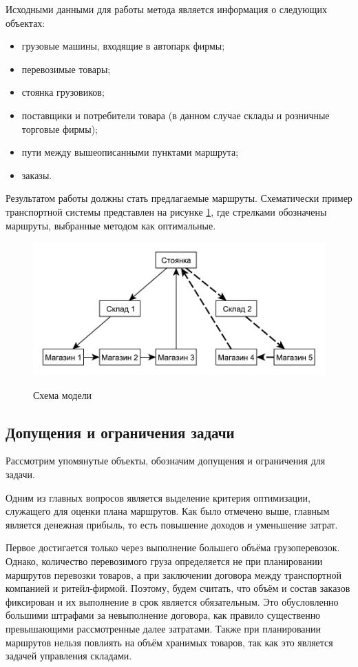 	Исходными данными для работы метода является информация о следующих объектах:
	\begin{itemize}
		\item грузовые машины, входящие в автопарк фирмы;
		\item перевозимые товары;
		\item стоянка грузовиков;
		\item поставщики и потребители товара (в данном случае склады и розничные торговые фирмы);
		\item пути между вышеописанными пунктами маршрута;
		\item заказы.
	\end{itemize}

	Результатом работы должны стать предлагаемые маршруты. Схематически пример транспортной системы представлен на рисунке \ref{pic:model}, где стрелками обозначены маршруты, выбранные методом как оптимальные.
	
	\begin{figure}[h!] 
		\begin{center}
			{\includegraphics[scale=0.9, angle=0]{img/model.pdf}}
			\caption{Схема модели}
			\label{pic:model}
		\end{center}
	\end{figure}
	
	\subsection{Допущения и ограничения задачи}
	Рассмотрим упомянутые объекты, обозначим допущения и ограничения для задачи.
	
	Одним из главных вопросов является выделение критерия оптимизации, служащего для оценки плана маршрутов. Как было отмечено выше, главным является денежная прибыль, то есть повышение доходов и уменьшение затрат.   
	
	Первое достигается только через выполнение большего объёма грузоперевозок. Однако, количество перевозимого груза определяется не при планировании маршрутов перевозки товаров, а при заключении договора между транспортной компанией и ритейл-фирмой. Поэтому, будем считать, что объём и состав заказов фиксирован и их выполнение в срок является обязательным. Это обусловленно большими штрафами за невыполнение договора, как правило существенно превышающими рассмотренные далее затратами. Также при планировании маршрутов нельзя повлиять на объём хранимых товаров, так как это является задачей управления складами.
	
